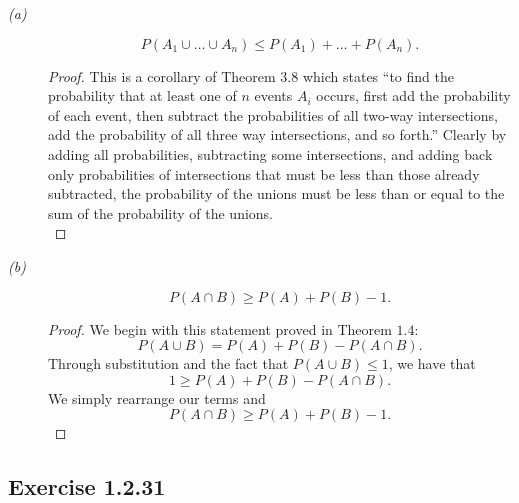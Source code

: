 \documentclass{tufte-handout}
\begin{document}
\begin{description}
\item[\emph{(a)}]
  \[
  P(A_1 \cup \dots \cup A_n) \leq P(A_1) + \dots + P(A_n).
  \]

  \begin{proof} This is a corollary of Theorem $3.8$ which states ``to
    find the probability that at least one of $n$ events $A_i$ occurs,
    first add the probability of each event, then subtract the
    probabilities of all two-way intersections, add the probability of
    all three way intersections, and so forth.'' Clearly by adding all
    probabilities, subtracting some intersections, and adding back
    only probabilities of intersections that must be less than those
    already subtracted, the probability of the unions must be less
    than or equal to the sum
    of the probability of the unions.\\
  \end{proof}

\item[\emph{(b)}]
  \[P(A \cap B) \geq P(A) + P(B) - 1.\]

  \begin{proof}
    We begin with this statement proved in Theorem $1.4$:
    \[P(A \cup B) = P(A) + P(B) - P(A \cap B).\]
    Through substitution and the fact that $P(A \cup B) \leq 1$, we
    have that
    \[1 \geq P(A) + P(B) - P(A \cap B).\]
    We simply rearrange our terms and
    \[P(A \cap B) \geq P(A) + P(B) - 1.\]
  \end{proof}
\end{description}

\subsection{Exercise 1.2.31}
\end{document}

